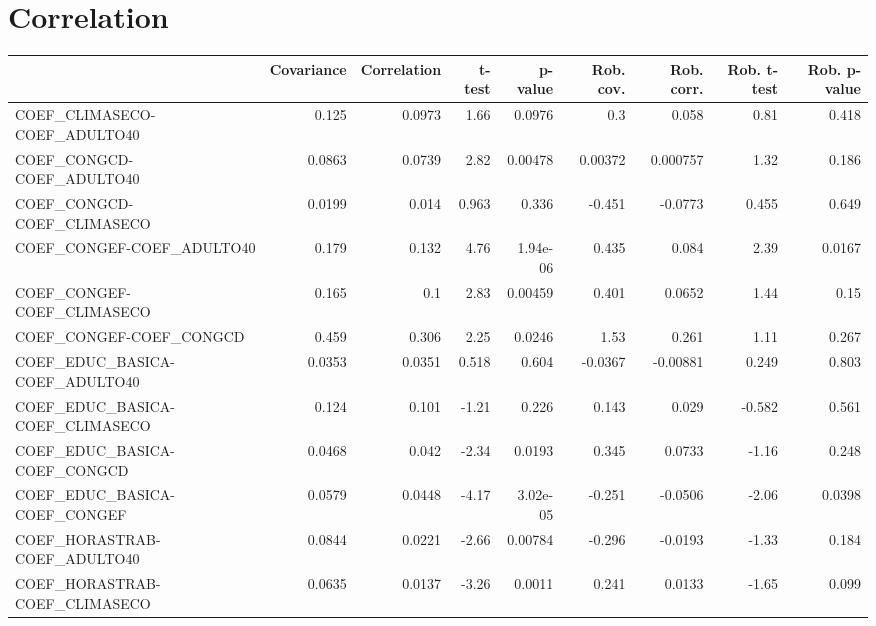 \section{Correlation}
\begin{tabular}{lrrrrrrrr}
\toprule
{} &  Covariance &  Correlation &  t-test &  p-value &  Rob. cov. &  Rob. corr. &  Rob. t-test &  Rob. p-value \\
\midrule
COEF\_CLIMASECO-COEF\_ADULTO40          &       0.125 &       0.0973 &    1.66 &   0.0976 &        0.3 &       0.058 &         0.81 &         0.418 \\
COEF\_CONGCD-COEF\_ADULTO40             &      0.0863 &       0.0739 &    2.82 &  0.00478 &    0.00372 &    0.000757 &         1.32 &         0.186 \\
COEF\_CONGCD-COEF\_CLIMASECO            &      0.0199 &        0.014 &   0.963 &    0.336 &     -0.451 &     -0.0773 &        0.455 &         0.649 \\
COEF\_CONGEF-COEF\_ADULTO40             &       0.179 &        0.132 &    4.76 & 1.94e-06 &      0.435 &       0.084 &         2.39 &        0.0167 \\
COEF\_CONGEF-COEF\_CLIMASECO            &       0.165 &          0.1 &    2.83 &  0.00459 &      0.401 &      0.0652 &         1.44 &          0.15 \\
COEF\_CONGEF-COEF\_CONGCD               &       0.459 &        0.306 &    2.25 &   0.0246 &       1.53 &       0.261 &         1.11 &         0.267 \\
COEF\_EDUC\_BASICA-COEF\_ADULTO40        &      0.0353 &       0.0351 &   0.518 &    0.604 &    -0.0367 &    -0.00881 &        0.249 &         0.803 \\
COEF\_EDUC\_BASICA-COEF\_CLIMASECO       &       0.124 &        0.101 &   -1.21 &    0.226 &      0.143 &       0.029 &       -0.582 &         0.561 \\
COEF\_EDUC\_BASICA-COEF\_CONGCD          &      0.0468 &        0.042 &   -2.34 &   0.0193 &      0.345 &      0.0733 &        -1.16 &         0.248 \\
COEF\_EDUC\_BASICA-COEF\_CONGEF          &      0.0579 &       0.0448 &   -4.17 & 3.02e-05 &     -0.251 &     -0.0506 &        -2.06 &        0.0398 \\
COEF\_HORASTRAB-COEF\_ADULTO40          &      0.0844 &       0.0221 &   -2.66 &  0.00784 &     -0.296 &     -0.0193 &        -1.33 &         0.184 \\
COEF\_HORASTRAB-COEF\_CLIMASECO         &      0.0635 &       0.0137 &   -3.26 &   0.0011 &      0.241 &      0.0133 &        -1.65 &         0.099 \\

\end{tabular}
